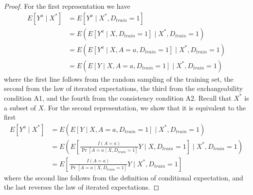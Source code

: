     \begin{proof}
        For the first representation we have 
        \begin{align*}
            E[Y^a \mid X^*] & = E[Y^a \mid X^*, D_{train} = 1] \\
            & = E(E[Y^a\mid X, D_{train} = 1] \mid X^*, D_{train} = 1) \\
            & = E(E[Y^a\mid X, A = a, D_{train} = 1] \mid X^*, D_{train} = 1) \\
            & = E(E[Y \mid X, A = a, D_{train} = 1] \mid X^*, D_{train} = 1) 
        \end{align*}
        where the first line follows from the random sampling of the training set, the second from the law of iterated expectations, the third from the exchangeability condition A1, and the fourth from the consistency condition A2. Recall that $X^*$ is a subset of $X$. For the second representation, we show that it is equivalent to the first 
        \begin{align*}
            E[Y^a \mid X^*] &= E(E[Y \mid X, A = a, D_{train} = 1] \mid X^*, D_{train} = 1)  \\
            &= E\left(E\left[\frac{I(A = a)}{\Pr[A = a \mid X,D_{train} = 1]}Y \mid X,D_{train} = 1\right] \mid X^*, D_{train} = 1\right)\\
            &= E\left[\frac{I(A = a)}{\Pr[A = a \mid X,D_{train} = 1]}Y \mid X^*, D_{train} = 1\right]
        \end{align*}
        where the second line follows from the definition of conditional expectation, and the last reverses the law of iterated expectations.
    \end{proof}

